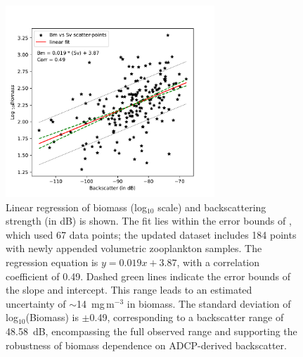 \documentclass[authoryear,review,11pt]{elsarticle}
\begin{document}
\newpage
\begin{figure}[htbp]
	\centering
	\includegraphics[width=0.7\textwidth]{./figures/bstobm.pdf} 
	\captionsetup{justification=justified,font=footnotesize,skip=0.05\baselineskip,width=0.8\textwidth}
	\caption{Linear regression of biomass (log$_{10}$ scale) and backscattering strength (in dB) is shown. The fit lies within the error bounds of \citet{aparna2022seasonal}, which used 67 data points; the updated dataset includes 184 points with newly appended volumetric zooplankton samples. The regression equation is $y = 0.019 x + 3.87$, with a correlation coefficient of 0.49. Dashed green lines indicate the error bounds of the slope and intercept. This range leads to an estimated uncertainty of $\sim$14~mg\,m$^{-3}$ in biomass. The standard deviation of log$_{10}$(Biomass) is $\pm$0.49, corresponding to a backscatter range of 48.58~dB, encompassing the full observed range and supporting the robustness of biomass dependence on ADCP-derived backscatter.}
	\label{fig:bstobm}
\end{figure}

\newpage
\end{document}
